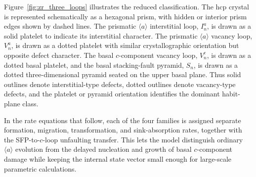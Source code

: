 Figure~\ref{fig:zr_three_loops} illustrates the reduced classification.  The
hcp crystal is represented schematically as a hexagonal prism, with hidden or
interior prism edges shown by dashed lines.  The prismatic
$\langle a\rangle$ interstitial loop, $I_n^a$, is drawn as a solid platelet
to indicate its interstitial character.  The prismatic $\langle a\rangle$
vacancy loop, $V_n^a$, is drawn as a dotted platelet with similar
crystallographic orientation but opposite defect character.  The basal
$c$-component vacancy loop, $V_n^c$, is drawn as a dotted basal platelet, and
the basal stacking-fault pyramid, $S_n$, is drawn as a dotted three-dimensional
pyramid seated on the upper basal plane.  Thus solid outlines denote
interstitial-type defects, dotted outlines denote vacancy-type defects, and
the platelet or pyramid orientation identifies the dominant habit-plane class.

In the rate equations that follow, each of the four families is assigned
separate formation, migration, transformation, and sink-absorption rates,
together with the SFP-to-$c$-loop unfaulting transfer.  This lets the model
distinguish ordinary $\langle a\rangle$ evolution from the delayed nucleation
and growth of basal $c$-component damage while keeping the internal state
vector small enough for large-scale parametric calculations.

